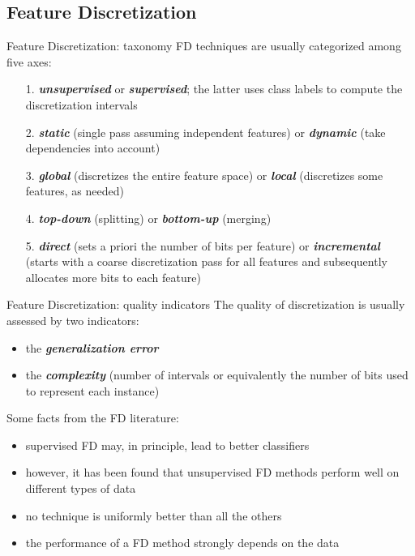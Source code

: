 \documentclass{beamer}
\begin{document}
\subsection[{Feature Discretization}]{Feature Discretization}
\begin{frame}{Feature Discretization: taxonomy}
FD techniques are usually categorized among five axes:
\begin{itemize}
	\vfill
	\item[1.] \textbf{\emph{unsupervised}} or \textbf{\emph{supervised}}; the latter uses 
	class labels to compute the discretization intervals 	
	
	\vfill
	\item[2.] \textbf{\emph{static}} (single pass assuming independent features) or 
	\textbf{\emph{dynamic}} (take dependencies into account)
	
	\vfill
	\item[3.] \textbf{\emph{global}} (discretizes the entire feature space) 
	or \textbf{\emph{local}} (discretizes some features, as needed)
	
	\vfill
	\item[4.] \textbf{\emph{top-down}} (splitting) or \textbf{\emph{bottom-up}} (merging)
	
	\vfill
	\item[5.] \textbf{\emph{direct}} (sets a priori the number of bits per
feature) or \textbf{\emph{incremental}} (starts with a coarse discretization 
pass for all features and subsequently allocates more
bits to each feature)
\end{itemize}
\end{frame}


\begin{frame}{Feature Discretization: quality indicators}
The quality of discretization is usually assessed by
two indicators:
\begin{itemize}
	\item the \textbf{\emph{generalization error}} 
	\item the \textbf{\emph{complexity}} (number of intervals or equivalently
the number of bits used to represent each instance)
\end{itemize}

\vfill
Some facts from the FD literature:
\begin{itemize}
	\item supervised FD may, in principle, lead to better classifiers
	\item however, it has been found that unsupervised FD methods
perform well on different types of data
	\item no technique is uniformly better than all the others
	\item the performance of a FD method strongly depends on the data
\end{itemize}
\end{frame}
\end{document}

